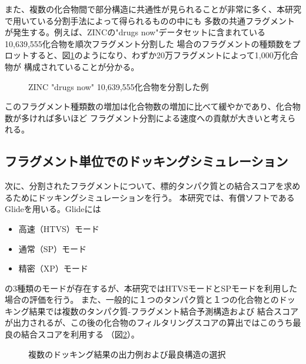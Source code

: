また、複数の化合物間で部分構造に共通性が見られることが非常に多く、本研究で用いている分割手法によって得られるものの中にも
多数の共通フラグメントが発生する。例えば、ZINCの"drugs now"データセットに含まれている10,639,555化合物を順次フラグメント分割した
場合のフラグメントの種類数をプロットすると、図\ref{fig:decomposition_amount}のようになり、わずか20万フラグメントによって1,000万化合物が
構成されていることが分かる。
\begin{figure}[htp]
 \begin{center}
  \caption{ZINC "drugs now" 10,639,555化合物を分割した例}
  \label{fig:decomposition_amount}
 \end{center}
\end{figure}
このフラグメント種類数の増加は化合物数の増加に比べて緩やかであり、化合物数が多ければ多いほど
フラグメント分割による速度への貢献が大きいと考えられる。

\subsection{フラグメント単位でのドッキングシミュレーション}
次に、分割されたフラグメントについて、標的タンパク質との結合スコアを求めるためにドッキングシミュレーションを行う。
本研究では、有償ソフトであるGlide\cite{Friesner2004}を用いる。Glideには
\begin{itemize}
\item 高速（HTVS）モード
\item 通常（SP）モード
\item 精密（XP）モード
\end{itemize}
の3種類のモードが存在するが、本研究ではHTVSモードとSPモードを利用した場合の評価を行う。
また、一般的に１つのタンパク質と１つの化合物とのドッキング結果では複数のタンパク質-フラグメント結合予測構造および
結合スコアが出力されるが、この後の化合物のフィルタリングスコアの算出ではこのうち最良の結合スコアを利用する
（図\ref{fig:fragment_result}）。

\begin{figure}[t]
\begin{minipage}{0.5\hsize}
 \begin{center}
 \end{center}
\end{minipage}
\begin{minipage}{0.5\hsize}
 \begin{center}
 \end{center}
\end{minipage}
 \caption{複数のドッキング結果の出力例および最良構造の選択}
 \label{fig:fragment_result}
\end{figure}

